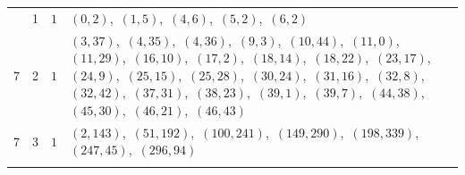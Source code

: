 \documentclass[11pt]{article}
\begin{document}
\begin{longtable}{@{}rrl>{\raggedright\arraybackslash}p{}@{}}
\addlinespace[3pt]
7 & 1 & $1$ & $(0,2)$,\allowbreak\ $(1,5)$,\allowbreak\ $(4,6)$,\allowbreak\ $(5,2)$,\allowbreak\ $(6,2)$\\
7 & 2 & $1$ & $(3,37)$,\allowbreak\ $(4,35)$,\allowbreak\ $(4,36)$,\allowbreak\ $(9,3)$,\allowbreak\ $(10,44)$,\allowbreak\ $(11,0)$,\allowbreak\ $(11,29)$,\allowbreak\ $(16,10)$,\allowbreak\ $(17,2)$,\allowbreak\ $(18,14)$,\allowbreak\ $(18,22)$,\allowbreak\ $(23,17)$,\allowbreak\ $(24,9)$,\allowbreak\ $(25,15)$,\allowbreak\ $(25,28)$,\allowbreak\ $(30,24)$,\allowbreak\ $(31,16)$,\allowbreak\ $(32,8)$,\allowbreak\ $(32,42)$,\allowbreak\ $(37,31)$,\allowbreak\ $(38,23)$,\allowbreak\ $(39,1)$,\allowbreak\ $(39,7)$,\allowbreak\ $(44,38)$,\allowbreak\ $(45,30)$,\allowbreak\ $(46,21)$,\allowbreak\ $(46,43)$\\
7 & 3 & $1$ & $(2,143)$,\allowbreak\ $(51,192)$,\allowbreak\ $(100,241)$,\allowbreak\ $(149,290)$,\allowbreak\ $(198,339)$,\allowbreak\ $(247,45)$,\allowbreak\ $(296,94)$\\
\addlinespace[3pt]
\end{longtable}
\endgroup
\end{document}
